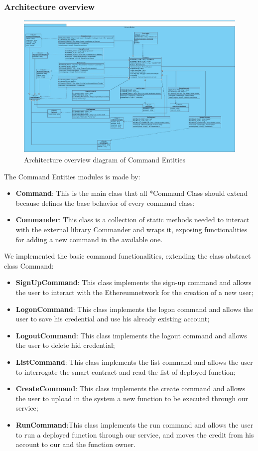 \subsubsection{Architecture overview}
\begin{figure}[h]
	\centering
	\includegraphics[width=\textwidth]{./res/img/Etherless-cli_commandEntities.jpg}
	\caption{Architecture overview diagram of Command Entities}
\end{figure}
\noindent The Command Entities modules is made by:
\begin{itemize}
    \item \textbf{Command}: This is the main class that all *Command Class should extend because defines the base behavior of every command class;
    \item \textbf{Commander}: This class is a collection of static methods needed to interact with the external library Commander and wraps it, exposing functionalities for adding a new command in the available one.
\end{itemize}
We implemented the basic command functionalities, extending the class abstract class Command:
\begin{itemize}
    \item \textbf{SignUpCommand}: This class implements the sign-up command and allows the user to interact with the Ethereum\glo network for the creation of a new user;
    \item \textbf{LogonCommand}: This class implements the logon command and allows the user to save his credential and use his already existing account;
    \item \textbf{LogoutCommand}: This class implements the logout command and allows the user to delete hid credential;
    \item \textbf{ListCommand}: This class implements the list command and allows the user to interrogate the smart contract and read the list of deployed function;
    \item \textbf{CreateCommand}: This class implements the create command and allows the user to upload in the system a new function to be executed through our service;
    \item \textbf{RunCommand}:This class implements the run command and allows the user to run a deployed function through our service, and moves the credit from his account to our and the function owner.
\end{itemize}
